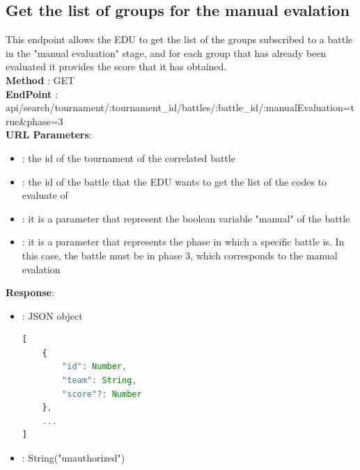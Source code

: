 \subsection*{Get the list of groups for the manual evalation}
This endpoint allows the EDU to get the list of the groups subscribed to a battle in the "manual evaluation" stage, and for each group that has already been evaluated it provides the score that it has obtained.\\
\textbf{Method} : GET \\
\textbf{EndPoint} : api/search/tournament/:tournament\_id/battles/:battle\_id/:manualEvaluation=true\&phase=3 \\
\textbf{URL Parameters}:
\begin{itemize}
    \item {} : the id of the tournament of the correlated battle
    \item {} : the id of the battle that the EDU wants to get the list of the codes to evaluate of
    \item {} : it is a parameter that represent the boolean variable "manual" of the battle
    \item {} : it is a parameter that represents the phase in which a specific battle is. In this case, the battle must be in phase 3, which corresponds to the manual evalation
\end{itemize}
\textbf{Response}:
\begin{itemize}
    \item {} : JSON object
          \begin{lstlisting}[language=JavaScript, label={lst:jscode}, basicstyle=\ttfamily]
[
    {
        "id": Number,
        "team": String,
        "score"?: Number
    },
    ...
]
        \end{lstlisting}
    \item {} : String("unauthorized")
\end{itemize}

